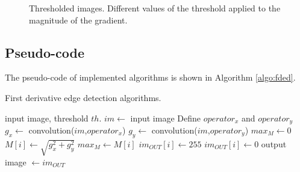 \documentclass{ipol}
\numberwithin{equation}{section}
\numberwithin{table}{section}
\begin{document}
\begin{figure}[t!]
	\centering
	\quad
	\quad
	\caption{Thresholded images. Different values of the threshold applied to the magnitude of the gradient.}
	\label{fig:thresholding}
\end{figure}



\subsection{Pseudo-code}

The pseudo-code of implemented algorithms is shown in Algorithm \ref{algo:fded}.

\begin{algorithm}[t]
\caption{First derivative edge detection algorithms.}
\label{algo:fded}
\begin{algorithmic}[1]
\REQUIRE input image, threshold $th$.
\STATE $im \leftarrow$ input image
\STATE Define $operator_x$ and $operator_y$ 
\STATE $g_x \leftarrow$ convolution($im$,$operator_x$)
\STATE $g_y \leftarrow$ convolution($im$,$operator_y$)
\STATE $max_M \leftarrow 0$
	\STATE $M[i] \leftarrow \sqrt{g_x^2+g_y^2}$ 
		\STATE $max_M \leftarrow M[i]$
	\ENDIF
\ENDFOR
{}
		\STATE $im_{OUT}[i] \leftarrow 255$
	\ELSE
		\STATE $im_{OUT}[i] \leftarrow 0$
	\ENDIF
\ENDFOR
\RETURN output image $\leftarrow im_{OUT}$
\end{algorithmic}
\end{algorithm}
\end{document}
